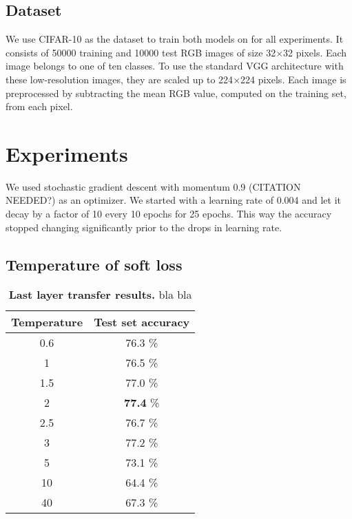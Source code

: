 \documentclass[10pt,twocolumn,letterpaper]{article}
\begin{document}
\subsection{Dataset}
We use CIFAR-10 \cite{krizhevsky2009learning} as the dataset to train both models on for all experiments. It consists of 50000 training and 10000 test RGB images of size 32$\times$32 pixels. Each image belongs to one of ten classes. To use the standard VGG architecture with these low-resolution images, they are scaled up to 224$\times$224 pixels. Each image is preprocessed by subtracting the mean RGB value, computed on the training set, from each pixel. 
 

\section{Experiments}
We used stochastic gradient descent with momentum 0.9 (CITATION NEEDED?) as an optimizer. We started with a learning rate of 0.004 and let it decay by a factor of 10 every 10 epochs for 25 epochs. This way the accuracy stopped changing significantly prior to the drops in learning rate.

\subsection{Temperature of soft loss}
\begin{table}[]
	\begin{center}
	\begin{tabular}{|c|c|}
		\hline
		Temperature	&	Test set accuracy\\ \hline
		0.6	&	76.3 \%	\\ \hline
		1	&	76.5 \%	\\ \hline
		1.5	&	77.0 \%	\\ \hline
		2	&	\textbf{77.4} \%	\\ \hline
		2.5	&	76.7 \%	\\ \hline
		3	&	77.2 \%	\\ \hline
		5	&	73.1 \%	\\ \hline
		10	&	64.4 \%	\\ \hline
		40	&	67.3 \%	\\ \hline
	\end{tabular}
	\end{center}
	\caption{\textbf{Last layer transfer results.} bla bla}
	\label{tab:LL_results}
\end{table}
\end{document}
